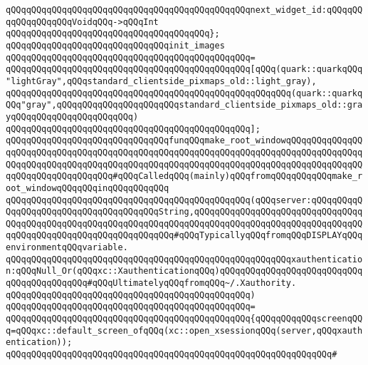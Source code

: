 \verb|qQQqqQQqqQQqqQQqqQQqqQQqqQQqqQQqqQQqqQQqqQQqqQQqnext_widget_id:qQQqqQQqqQQqqQQqqQQqVoidqQQq->qQQqInt|\newline
\verb|qQQqqQQqqQQqqQQqqQQqqQQqqQQqqQQqqQQqqQQq};|\newline
\newline
\verb|qQQqqQQqqQQqqQQqqQQqqQQqqQQqqQQqinit_images|\newline
\verb|qQQqqQQqqQQqqQQqqQQqqQQqqQQqqQQqqQQqqQQqqQQqqQQq=|\newline
\verb|qQQqqQQqqQQqqQQqqQQqqQQqqQQqqQQqqQQqqQQqqQQqqQQq[qQQq(quark::quarkqQQq"lightGray",qQQqstandard_clientside_pixmaps_old::light_gray),|\newline
\verb|qQQqqQQqqQQqqQQqqQQqqQQqqQQqqQQqqQQqqQQqqQQqqQQqqQQqqQQq(quark::quarkqQQq"gray",qQQqqQQqqQQqqQQqqQQqqQQqstandard_clientside_pixmaps_old::grayqQQqqQQqqQQqqQQqqQQqqQQq)|\newline
\verb|qQQqqQQqqQQqqQQqqQQqqQQqqQQqqQQqqQQqqQQqqQQqqQQq];|\newline
\newline
\verb|qQQqqQQqqQQqqQQqqQQqqQQqqQQqqQQqfunqQQqmake_root_windowqQQqqQQqqQQqqQQqqQQqqQQqqQQqqQQqqQQqqQQqqQQqqQQqqQQqqQQqqQQqqQQqqQQqqQQqqQQqqQQqqQQqqQQqqQQqqQQqqQQqqQQqqQQqqQQqqQQqqQQqqQQqqQQqqQQqqQQqqQQqqQQqqQQqqQQqqQQqqQQqqQQqqQQqqQQqqQQq#qQQqCalledqQQq(mainly)qQQqfromqQQqqQQqqQQqmake_root_windowqQQqqQQqinqQQqqQQqqQQq|\newline
\verb|qQQqqQQqqQQqqQQqqQQqqQQqqQQqqQQqqQQqqQQqqQQqqQQq(qQQqserver:qQQqqQQqqQQqqQQqqQQqqQQqqQQqqQQqqQQqqQQqString,qQQqqQQqqQQqqQQqqQQqqQQqqQQqqQQqqQQqqQQqqQQqqQQqqQQqqQQqqQQqqQQqqQQqqQQqqQQqqQQqqQQqqQQqqQQqqQQqqQQqqQQqqQQqqQQqqQQqqQQqqQQqqQQqqQQqqQQq#qQQqTypicallyqQQqfromqQQqDISPLAYqQQqenvironmentqQQqvariable.|\newline
\verb|qQQqqQQqqQQqqQQqqQQqqQQqqQQqqQQqqQQqqQQqqQQqqQQqqQQqqQQqxauthentication:qQQqNull_Or(qQQqxc::XauthenticationqQQq)qQQqqQQqqQQqqQQqqQQqqQQqqQQqqQQqqQQqqQQqqQQq#qQQqUltimatelyqQQqfromqQQq~/.Xauthority.|\newline
\verb|qQQqqQQqqQQqqQQqqQQqqQQqqQQqqQQqqQQqqQQqqQQqqQQq)|\newline
\verb|qQQqqQQqqQQqqQQqqQQqqQQqqQQqqQQqqQQqqQQqqQQqqQQq=|\newline
\verb|qQQqqQQqqQQqqQQqqQQqqQQqqQQqqQQqqQQqqQQqqQQqqQQq{qQQqqQQqqQQqscreenqQQq=qQQqxc::default_screen_ofqQQq(xc::open_xsessionqQQq(server,qQQqxauthentication));|\newline
\verb|qQQqqQQqqQQqqQQqqQQqqQQqqQQqqQQqqQQqqQQqqQQqqQQqqQQqqQQqqQQqqQQq#|\newline
